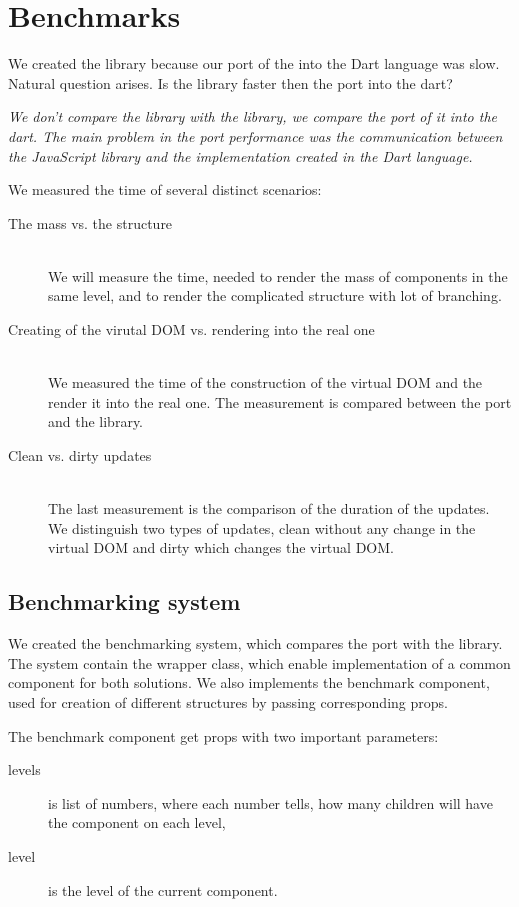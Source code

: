 \chapter{Benchmarks}\label{chap:benchmarks}

We created the \tiles library because our port of the \react into the Dart language was slow. 
Natural question arises. Is the \tiles library faster then the \react port into the dart?

\textit{
	We don't compare the \react library with the \tiles library, we compare the port of it into the dart. 
	The main problem in the port performance was the communication between the JavaScript \react library and the implementation created in the Dart language.
}

We measured the time of several distinct scenarios:
\begin{description}
	\item[The mass vs. the structure] \hfill \\
		We will measure the time, needed to render the mass of components in the same level, 
		and to render the complicated structure with lot of branching.
	\item[Creating of the virutal DOM vs. rendering into the real one] \hfill \\
		We measured the time of the construction of the virtual DOM and the render it into the real one. 
		The measurement is compared between the port and the \tiles library.
	\item[Clean vs. dirty updates] \hfill \\
		The last measurement is the comparison of the duration of the updates. 
		We distinguish two types of updates, clean without any change in the virtual DOM and dirty which changes the virtual DOM.
\end{description}

\section{Benchmarking system}\label{sec:benchmarks-system}

We created the benchmarking system, which compares the \react port with the \tiles library.
The system contain the wrapper class, which enable implementation of a common component for both solutions.
We also implements the benchmark component, used for creation of different structures by passing corresponding props.

The benchmark component get props with two important parameters: 
\begin{description}
	\item[levels] is list of numbers, where each number tells, how many children will have the component on each level,
	\item[level] is the level of the current component.
\end{description}

